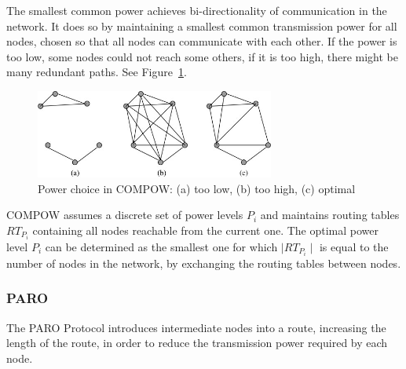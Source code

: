 The smallest common power\cite{narayanaswamy2002power} achieves bi-directionality
of communication in the network.
It does so by maintaining a smallest common transmission power for all nodes,
chosen so that all nodes can communicate with each other. If the power is too
low, some nodes could not reach some others, if it is too high, there might be
many redundant paths. See Figure~\ref{compow:power-choice}.


\begin{figure}
\centering
\includegraphics[width=0.7\textwidth]{images/compow-level-choice}
\caption{Power choice in COMPOW: (a) too low, (b) too high, (c) optimal}
\label{compow:power-choice}
\end{figure}

COMPOW assumes a discrete set of power levels $P_{i}$ and maintains routing
tables ${RT}_{P_{i}}$ containing all nodes reachable from the current one. The
optimal power level $P_{i}$ can be determined as the smallest one for which
$\mid RT_{P_{i}} \mid$ is equal to the number of nodes in the network, by
exchanging the routing tables between nodes.

\subsubsection{PARO}
The PARO Protocol\cite{gomez2003paro} introduces intermediate nodes into a
route, increasing the length of the route, in order to reduce the transmission
power required by each node.
